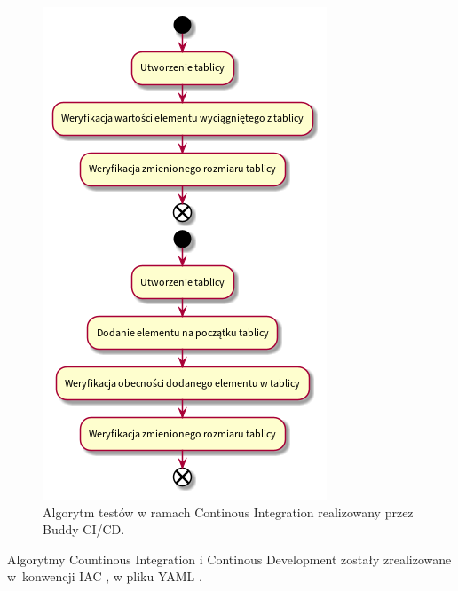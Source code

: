 \begin{figure}[H]
	\begin{center}
		\includegraphics[scale=0.6]{media/ContinousIntegration.png}
	\end{center}
	\caption{Algorytm testów w ramach Continous Integration realizowany przez Buddy CI/CD.}
	\label{rys:continous-integration}
\end{figure}

Algorytmy Countinous Integration i Continous Development zostały zrealizowane w~konwencji IAC \cite{iac}, w pliku YAML \cite{yaml}.